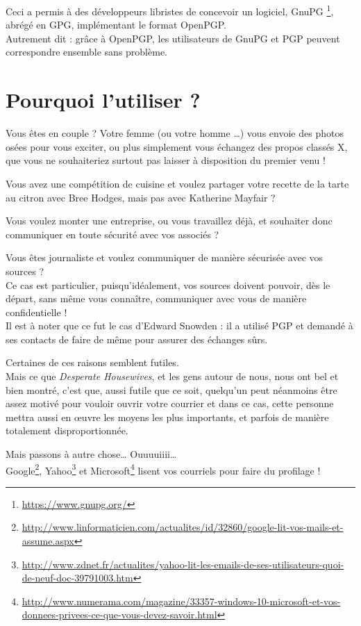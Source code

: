 Ceci a permis à des développeurs libristes de concevoir un logiciel, GnuPG
\footnote{\url{https://www.gnupg.org/}}, abrégé en GPG, implémentant le format OpenPGP.\\Autrement dit : grâce à OpenPGP, les utilisateurs de
GnuPG et PGP peuvent correspondre ensemble sans problème.

\section{Pourquoi l'utiliser ?}\label{pourquoi-lutiliser}

Vous êtes en couple ? Votre femme (ou votre homme \ldots{}) vous envoie
des photos osées pour vous exciter, ou plus simplement vous échangez des
propos classés X, que vous ne souhaiteriez surtout pas laisser à
disposition du premier venu !

Vous avez une compétition de cuisine et voulez partager votre recette de la tarte au citron avec Bree Hodges, mais pas avec Katherine Mayfair ?

Vous voulez monter une entreprise, ou vous travaillez déjà, et souhaiter donc communiquer en toute sécurité avec vos associés ?

Vous êtes journaliste et voulez communiquer de manière sécurisée avec vos sources ?\\Ce cas est
particulier, puisqu'idéalement, vos sources doivent pouvoir, dès le départ, sans même vous connaître, communiquer avec vous de manière
confidentielle !\\Il est à noter que ce fut le cas d'Edward Snowden : il a utilisé PGP et demandé à ses contacts de faire de même pour assurer
des échanges sûrs.

Certaines de ces raisons semblent futiles.\\Mais ce que \emph{Desperate Housewives}, et les gens autour de nous, nous ont bel et bien montré,
c'est que, aussi futile que ce soit, quelqu'un peut néanmoins être assez motivé pour vouloir ouvrir votre courrier et dans ce cas, cette personne
mettra aussi en œuvre les moyens les plus importants, et parfois de manière totalement disproportionnée.

Mais passons à autre chose\ldots{}
Ouuuuiiii\ldots{}\\

Google\footnote{\url{http://www.linformaticien.com/actualites/id/32860/google-lit-vos-mails-et-assume.aspx}},
Yahoo\footnote{\url{http://www.zdnet.fr/actualites/yahoo-lit-les-emails-de-ses-utilisateurs-quoi-de-neuf-doc-39791003.htm}}
et Microsoft\footnote{\url{http://www.numerama.com/magazine/33357-windows-10-microsoft-et-vos-donnees-privees-ce-que-vous-devez-savoir.html}} lisent vos courriels pour faire du profilage !

